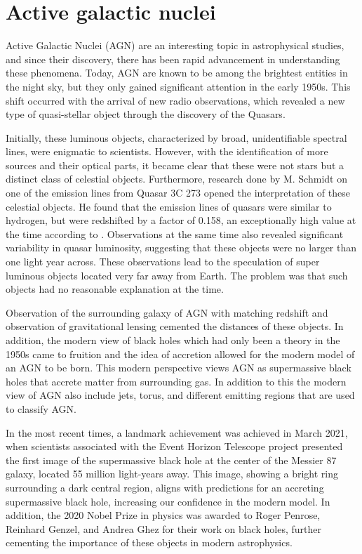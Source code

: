 \section{Active galactic nuclei}




Active Galactic Nuclei (AGN) are an interesting topic in astrophysical studies, and 
since their discovery, there has been rapid advancement in understanding these phenomena.
Today, AGN are known to be among the brightest entities in the night sky,
but they only gained significant attention in the early 1950s. 
This shift occurred with the arrival of new radio observations, which revealed a new type of quasi-stellar
object through the discovery of the Quasars.

Initially, these luminous objects, characterized by broad, 
unidentifiable spectral lines, were enigmatic to scientists. 
However, with the identification of more sources and their optical parts, 
it became clear that these were not stars but a distinct class of celestial objects. 
Furthermore, research done by M. Schmidt on one of the emission lines from 
Quasar 3C 273 opened the interpretation of these celestial objects. 
He found that the emission lines of quasars were similar to hydrogen, but were redshifted by a factor of 0.158,
an exceptionally high value at the time according to \cite{Shields_1999}. Observations at the same time also revealed significant 
variability in quasar luminosity, suggesting that these objects were no larger than one light year across. 
These observations lead to the speculation of super luminous objects located very far away from Earth. The problem was that such objects
had no reasonable explanation at the time. %

Observation of the surrounding galaxy of AGN with matching redshift and observation of gravitational lensing cemented 
the distances of these objects. In addition, the modern view of black holes which had only been a theory in the 1950s came to
fruition and the idea of accretion allowed for the modern model of an AGN to be born. This modern perspective views AGN as supermassive black holes that
accrete matter from surrounding gas. In addition to this the modern view of AGN also include jets, torus, and different emitting regions that are used to classify AGN.

In the most recent times, a landmark achievement was achieved in March 2021, when scientists associated with the Event Horizon Telescope project 
presented the first image of the supermassive black hole at the center of the Messier 87 galaxy, located 55 million light-years away.
This image, showing a bright ring surrounding a dark central region, aligns with predictions for an accreting supermassive black hole, 
increasing our confidence in the modern model. In addition, the 2020 Nobel Prize in physics was awarded to Roger Penrose, Reinhard Genzel, and Andrea Ghez for their work on black holes, 
further cementing the importance of these objects in modern astrophysics.





